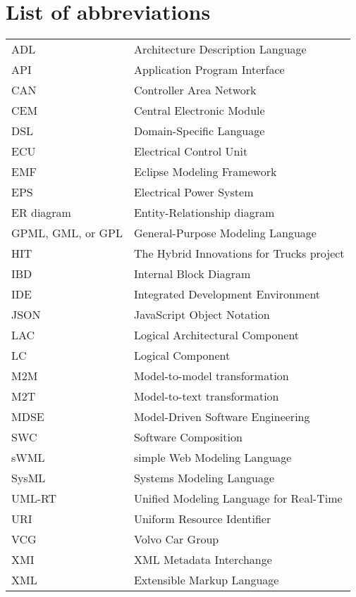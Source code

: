 
\thispagestyle{plain}			%

\section*{List of abbreviations}

\begin{table}[H]
\begin{tabular}{ll}
ADL & Architecture Description Language \\
API & Application Program Interface \\
CAN & Controller Area Network \\
CEM & Central Electronic Module \\
DSL & Domain-Specific Language \\
ECU & Electrical Control Unit \\
EMF & Eclipse Modeling Framework \\
EPS & Electrical Power System \\
ER diagram & Entity-Relationship diagram \\
GPML, GML, or GPL & General-Purpose Modeling Language \\
HIT & The Hybrid Innovations for Trucks project \\
IBD & Internal Block Diagram \\
IDE & Integrated Development Environment \\
JSON & JavaScript Object Notation \\
LAC & Logical Architectural Component \\
LC & Logical Component \\
M2M & Model-to-model transformation \\
M2T & Model-to-text transformation \\
MDSE & Model-Driven Software Engineering \\
SWC & Software Composition \\
sWML & simple Web Modeling Language \\
SysML & Systems Modeling Language \\
UML-RT &  Unified Modeling Language for Real-Time \\
URI & Uniform Resource Identifier \\
VCG & Volvo Car Group \\
XMI & XML Metadata Interchange \\
XML & Extensible Markup Language \\
\end{tabular}
\end{table}


